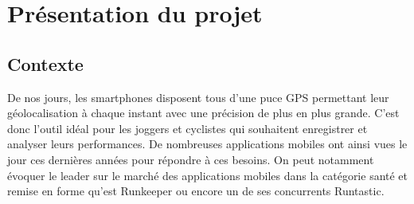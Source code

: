 \chapter{Présentation du projet}
\section{Contexte}
De nos jours, les smartphones disposent tous d'une puce GPS permettant leur géolocalisation à chaque instant avec une précision de plus en plus grande. C'est donc l'outil idéal pour les joggers et cyclistes qui souhaitent enregistrer et analyser leurs performances. De nombreuses applications mobiles ont ainsi vues le jour ces dernières années pour répondre à ces besoins. On peut notamment évoquer le leader sur le marché des applications mobiles dans la catégorie santé et remise en forme qu'est Runkeeper ou encore un de ses concurrents Runtastic.\bigskip \bigskip
